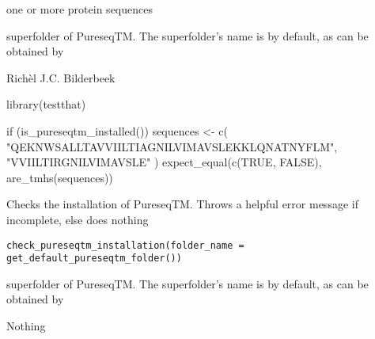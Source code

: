 \documentclass[letterpaper]{book}
\begin{document}
%
\begin{Arguments}
\begin{ldescription}
\item[\code{protein\_sequences}] one or more protein sequences

\item[\code{folder\_name}] superfolder of PureseqTM.
The superfolder's name is 
by default, as can be obtained by
\end{ldescription}
\end{Arguments}
%
\begin{Author}\relax
Richèl J.C. Bilderbeek
\end{Author}
%
\begin{Examples}
\begin{ExampleCode}
library(testthat)

if (is_pureseqtm_installed()) {
  sequences <- c(
    "QEKNWSALLTAVVIILTIAGNILVIMAVSLEKKLQNATNYFLM",
    "VVIILTIRGNILVIMAVSLE"
  )
  expect_equal(c(TRUE, FALSE), are_tmhs(sequences))
}
\end{ExampleCode}
\end{Examples}
%
\begin{Description}\relax
Checks the installation of PureseqTM.
Throws a helpful error message if incomplete,
else does nothing
\end{Description}
%
\begin{Usage}
\begin{verbatim}
check_pureseqtm_installation(folder_name = get_default_pureseqtm_folder())
\end{verbatim}
\end{Usage}
%
\begin{Arguments}
\begin{ldescription}
\item[\code{folder\_name}] superfolder of PureseqTM.
The superfolder's name is 
by default, as can be obtained by
\end{ldescription}
\end{Arguments}
%
\begin{Value}
Nothing
\end{Value}
\end{document}
